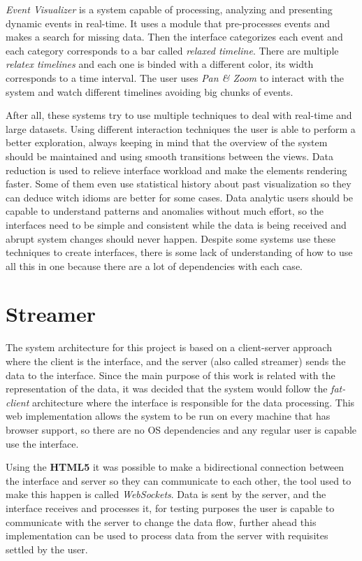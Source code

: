 \documentclass[letterpaper, 10 pt, conference]{ieeeconf}  %
\begin{document}
\textit{Event Visualizer} \cite{Fischer} is a system capable of processing, analyzing and presenting dynamic events in real-time. It uses a module that pre-processes events and makes a search for missing data. Then the interface categorizes each event and each category corresponds to a bar called \textit{relaxed timeline}. There are multiple \textit{relatex timelines} and each one is binded with a different color, its width corresponds to a time interval. The user uses \textit{Pan \& Zoom} to interact with the system and watch different timelines avoiding big chunks of events.

After all, these systems try to use multiple techniques to deal with real-time and large datasets. Using different interaction techniques the user is able to perform a better exploration, always keeping in mind that the overview of the system should be maintained and using smooth transitions between the views. Data reduction is used to relieve interface workload and make the elements rendering faster. Some of them even use statistical history about past visualization so they can deduce witch idioms are better for some cases. Data analytic users should be capable to understand patterns and anomalies without much effort, so the interfaces need to be simple and consistent while the data is being received and abrupt system changes should never happen. Despite some systems use these techniques to create interfaces, there is some lack of understanding of how to use all this in one because there are a lot of dependencies with each case.



\section{Streamer}
\label{section:streammer}

The system architecture for this project is based on a client-server approach where the client is the interface, and the server (also called streamer) sends the data to the interface. Since the main purpose of this work is related with the representation of the data, it was decided that the system would follow the \textit{fat-client} architecture where the interface is responsible for the data processing. This web implementation allows the system to be run on every machine that has browser support, so there are no OS dependencies and any regular user is capable use the interface.

Using the \textbf{HTML5} it was possible to make a bidirectional connection between the interface and server so they can communicate to each other, the tool used to make this happen is called \textit{WebSockets}. Data is sent by the server, and the interface receives and processes it, for testing purposes the user is capable to communicate with the server to change the data flow, further ahead this implementation can be used to process data from the server with requisites settled by the user.
\end{document}
